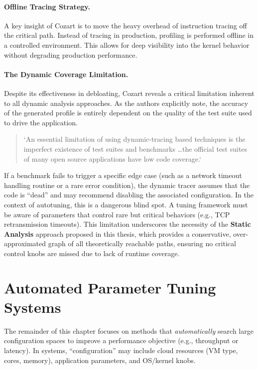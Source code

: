 \paragraph{Offline Tracing Strategy.}
A key insight of Cozart is to move the heavy overhead of instruction tracing off the critical path. 
Instead of tracing in production, profiling is performed offline in a controlled environment. 
This allows for deep visibility into the kernel behavior without degrading production performance.

\paragraph{The Dynamic Coverage Limitation.}
Despite its effectiveness in debloating, Cozart reveals a critical limitation inherent to all dynamic analysis approaches. 
As the authors explicitly note, the accuracy of the generated profile is entirely dependent on the quality of the test suite used to drive the application. 
\begin{quote}
    `An essential limitation of using dynamic-tracing based techniques is the imperfect existence of test suites and benchmarks \ldots the official test suites of many open source applications have low code coverage.`~\cite{cozart_cacm}
\end{quote}
If a benchmark fails to trigger a specific edge case (such as a network timeout handling routine or a rare error condition), the dynamic tracer assumes that the code is ``dead'' and may recommend disabling the associated configuration. 
In the context of autotuning, this is a dangerous blind spot. A tuning framework must be aware of parameters that control rare but critical behaviors (e.g., TCP retransmission timeouts). 
This limitation underscores the necessity of the \textbf{Static Analysis} approach proposed in this thesis, which provides a conservative, over-approximated graph of all theoretically reachable paths, ensuring no critical control knobs are missed due to lack of runtime coverage.

\section{Automated Parameter Tuning Systems}\label{sec:bg-autotuning}

The remainder of this chapter focuses on methods that \textit{automatically} search large configuration spaces to improve a performance objective (e.g., throughput or latency).
In systems, ``configuration'' may include cloud resources (VM type, cores, memory), application parameters, and OS/kernel knobs.

